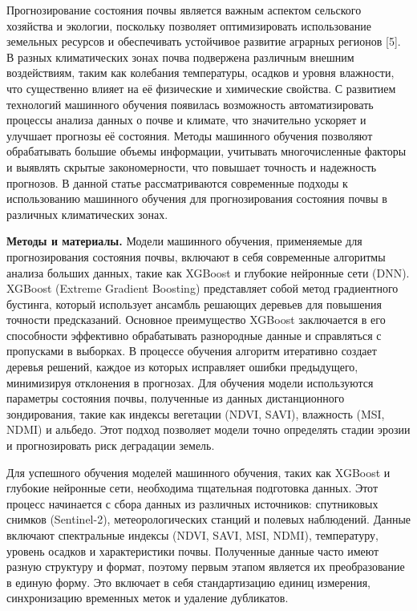 Прогнозирование состояния почвы является важным аспектом сельского
хозяйства и экологии, поскольку позволяет оптимизировать использование
земельных ресурсов и обеспечивать устойчивое развитие аграрных регионов
{[}5{]}. В разных климатических зонах почва подвержена различным внешним
воздействиям, таким как колебания температуры, осадков и уровня
влажности, что существенно влияет на её физические и химические
свойства. С развитием технологий машинного обучения появилась
возможность автоматизировать процессы анализа данных о почве и климате,
что значительно ускоряет и улучшает прогнозы её состояния. Методы
машинного обучения позволяют обрабатывать большие объемы информации,
учитывать многочисленные факторы и выявлять скрытые закономерности, что
повышает точность и надежность прогнозов. В данной статье
рассматриваются современные подходы к использованию машинного обучения
для прогнозирования состояния почвы в различных климатических зонах.

{\bfseries Методы и материалы.} Модели машинного обучения, применяемые для
прогнозирования состояния почвы, включают в себя современные алгоритмы
анализа больших данных, такие как XGBoost и глубокие нейронные сети
(DNN). XGBoost (Extreme Gradient Boosting) представляет собой метод
градиентного бустинга, который использует ансамбль решающих деревьев для
повышения точности предсказаний. Основное преимущество XGBoost
заключается в его способности эффективно обрабатывать разнородные данные
и справляться с пропусками в выборках. В процессе обучения алгоритм
итеративно создает деревья решений, каждое из которых исправляет ошибки
предыдущего, минимизируя отклонения в прогнозах. Для обучения модели
используются параметры состояния почвы, полученные из данных
дистанционного зондирования, такие как индексы вегетации (NDVI, SAVI),
влажность (MSI, NDMI) и альбедо. Этот подход позволяет модели точно
определять стадии эрозии и прогнозировать риск деградации земель.

Для успешного обучения моделей машинного обучения, таких как XGBoost и
глубокие нейронные сети, необходима тщательная подготовка данных. Этот
процесс начинается с сбора данных из различных источников: спутниковых
снимков (Sentinel-2), метеорологических станций и полевых наблюдений.
Данные включают спектральные индексы (NDVI, SAVI, MSI, NDMI),
температуру, уровень осадков и характеристики почвы. Полученные данные
часто имеют разную структуру и формат, поэтому первым этапом является их
преобразование в единую форму. Это включает в себя стандартизацию единиц
измерения, синхронизацию временных меток и удаление дубликатов.

